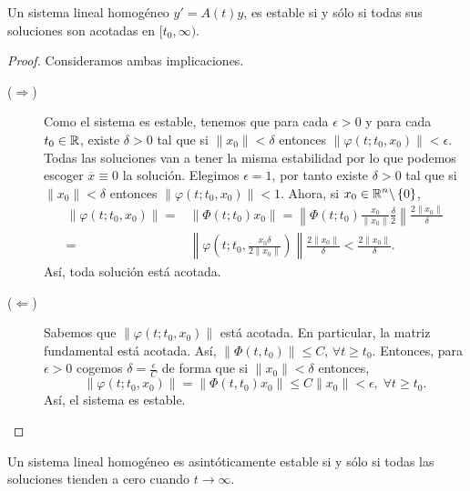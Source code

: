 \begin{theorem}
Un sistema lineal homogéneo $\displaystyle y' = A\left(t\right)y $, es estable si y sólo si todas sus soluciones son acotadas en $\displaystyle [t_{0}, \infty) $. 
\end{theorem}
\begin{proof}
Consideramos ambas implicaciones.
\begin{description}
\item[($\displaystyle \Rightarrow $)] Como el sistema es estable, tenemos que para cada $\displaystyle \epsilon > 0 $ y para cada $\displaystyle t_{0} \in \mathbb{R} $, existe $\displaystyle \delta > 0 $ tal que si $\displaystyle \|x_{0}\| < \delta  $ entonces $\displaystyle \|\varphi\left(t; t_{0}, x_{0}\right)\|< \epsilon  $. Todas las soluciones van a tener la misma estabilidad por lo que podemos escoger $\displaystyle \overline{x}\equiv 0 $ la solución. Elegimos $\displaystyle \epsilon = 1 $, por tanto existe $\displaystyle \delta > 0 $ tal que si $\displaystyle \|x_{0}\| < \delta  $ entonces $\displaystyle \|\varphi\left(t; t_{0}, x_{0}\right)\| < 1 $. 
	Ahora, si $\displaystyle x_{0}\in \mathbb{R}^{n} \backslash \left\{ 0\right\}  $,
	\[
	\begin{split}
		\|\varphi\left(t; t_{0}, x_{0}\right)\| = & \|\Phi\left(t; t_{0}\right)x_{0}\| = \left\|\Phi\left(t; t_{0}\right)\frac{x_{0}}{\|x_{0}\|}\frac{\delta }{2}\right\|\frac{2\|x_{0}\|}{\delta } \\
		= &  \left\|\varphi\left(t; t_{0}, \frac{x_{0}\delta }{2\|x_{0}\|}\right)\right\|\frac{2\|x_{0}\|}{\delta } < \frac{2\|x_{0}\|}{\delta }.
	\end{split}
	\]
	Así, toda solución está acotada. 
\item[($\displaystyle \Leftarrow $)] Sabemos que $\displaystyle \|\varphi\left(t; t_{0}, x_{0}\right)\| $ está acotada. En particular, la matriz fundamental está acotada. Así, $\displaystyle \|\Phi\left(t, t_{0}\right)\| \leq C $, $\displaystyle \forall t \geq t_{0} $. Entonces, para $\displaystyle  \epsilon > 0 $ cogemos $\displaystyle \delta = \frac{\epsilon }{C} $ de forma que si $\displaystyle \|x_{0}\| < \delta  $ entonces, 
	\[ \|\varphi\left(t; t_{0}, x_{0}\right)\| = \left\|\Phi\left(t, t_{0}\right)x_{0}\right\| \leq C \|x_{0}\| < \epsilon, \; \forall t \geq t_{0} .\]
	Así, el sistema es estable.
\end{description}
\end{proof}
\begin{theorem}
Un sistema lineal homogéneo es asintóticamente estable si y sólo si todas las soluciones tienden a cero cuando $\displaystyle t \to \infty  $. 
\end{theorem}
